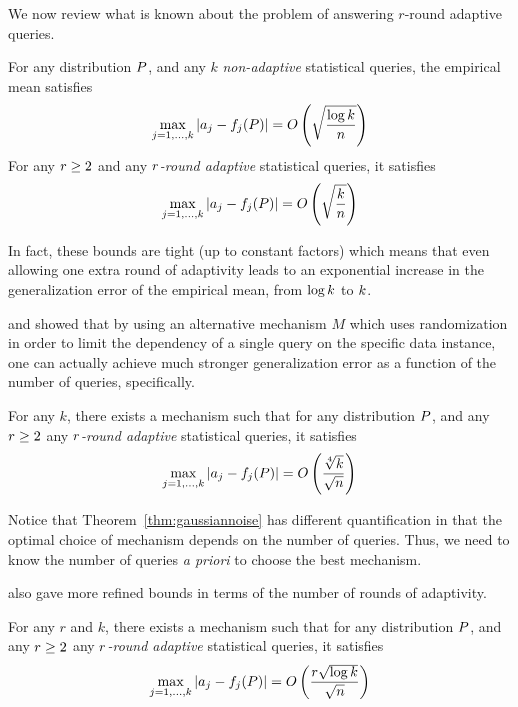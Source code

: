 We now review what is known about the problem of answering $r$-round adaptive queries.  
\begin{thm} 
\label{thm:nonadapt-adapt}
For any distribution $P$, and any $k$ \emph{non-adaptive} statistical queries, the empirical mean satisfies
$$
\max_{j=1,\dots,k} | a_j - f_j(P) | = O\left( \sqrt{\frac{\log k}{n}}  \right)
$$
For any $r \geq 2$ and any \emph{$r$-round adaptive} statistical queries, it satisfies
$$
\max_{j=1,\dots,k} | a_j - f_j(P) | = O\left( \sqrt{\frac{k}{n}}  \right)
$$
\end{thm}
In fact, these bounds are tight (up to constant factors) which means that even allowing one extra round of adaptivity leads to an exponential increase in the generalization error of the empirical mean, from $\log k$ to $k$.

\citet{DworkFHPRR15} and \citet{BassilyNSSSU16} showed that by using an alternative mechanism $M$ which uses randomization in order to limit the dependency of a single query on the specific data instance, one 
can actually achieve much stronger generalization error as a function of the number of queries, specifically.
\begin{thm} \label{thm:gaussiannoise} For any $k$, there exists a mechanism such that for any distribution $P$, and any $r \geq 2$ any \emph{$r$-round adaptive} statistical queries, it satisfies
$$
\max_{j=1,\dots,k} | a_j - f_j(P) | = O\left( \frac{\sqrt[4]{k}}{\sqrt{n}}  \right)
$$
\end{thm}
Notice that Theorem~\ref{thm:gaussiannoise} has different quantification in that the optimal choice of mechanism depends on the number of queries.  Thus, we need to know the number of queries \emph{a priori} to choose the best mechanism.


\citet{DworkFHPRR15}
also gave more refined bounds in terms of the number of rounds of adaptivity.   %
\begin{thm} \label{thm:gaussiannoise2} For any $r$ and $k$, there exists a mechanism such that for any distribution $P$, and any $r \geq 2$ any \emph{$r$-round adaptive} statistical queries, it satisfies
$$
\max_{j=1,\dots,k} | a_j - f_j(P) | = O\left( \frac{r \sqrt{\log k}}{\sqrt{n}}  \right)
$$
\end{thm}

